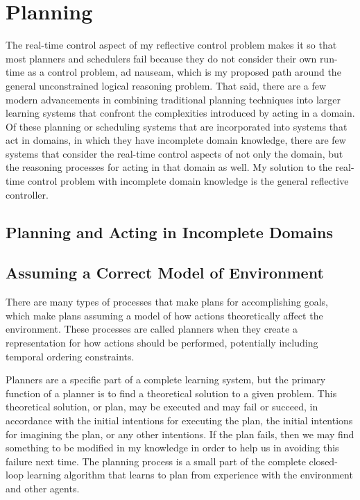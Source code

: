 \citep[p.~78]{minsky:1988}



\section{Planning}

The real-time control aspect of my reflective control problem makes it
so that most planners and schedulers fail because they do not consider
their own run-time as a control problem, ad nauseam, which is my
proposed path around the general unconstrained logical reasoning
problem.  That said, there are a few modern advancements in combining
traditional planning techniques into larger learning systems that
confront the complexities introduced by acting in a domain.  Of these
planning or scheduling systems that are incorporated into systems that
act in domains, in which they have incomplete domain knowledge, there
are few systems that consider the real-time control aspects of not
only the domain, but the reasoning processes for acting in that domain
as well.  My solution to the real-time control problem with incomplete
domain knowledge is the general reflective controller.

\subsection{Planning and Acting in Incomplete Domains}

\citep{weber:2011}

\subsection{Assuming a Correct Model of Environment}

There are many types of processes that make plans for accomplishing
goals, which make plans assuming a model of how actions theoretically
affect the environment.  These processes are called planners when they
create a representation for how actions should be performed,
potentially including temporal ordering constraints.

Planners are a specific part of a complete learning system, but the
primary function of a planner is to find a theoretical solution to a
given problem.  This theoretical solution, or plan, may be executed
and may fail or succeed, in accordance with the initial intentions for
executing the plan, the initial intentions for imagining the plan, or
any other intentions.  If the plan fails, then we may find something
to be modified in my knowledge in order to help us in avoiding this
failure next time.  The planning process is a small part of the
complete closed-loop learning algorithm that learns to plan from
experience with the environment and other agents.



